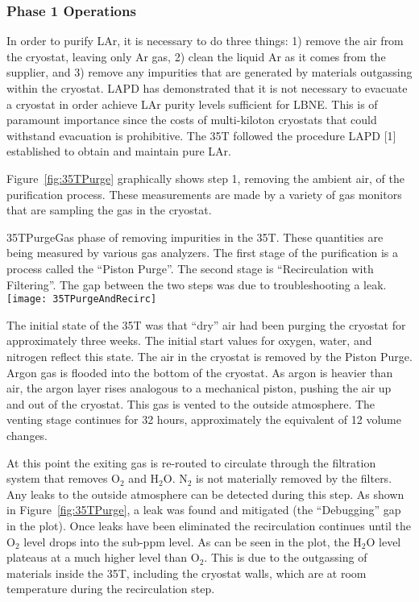 \subsubsection {Phase 1 Operations}

In order to purify LAr, it is necessary to do three things: 1) remove the air from the cryostat, leaving only Ar gas, 2) clean the liquid Ar as it comes from the supplier, and 3) remove any impurities that are generated by materials outgassing within the cryostat.  
LAPD has demonstrated that it is not necessary to evacuate a cryostat in order achieve LAr purity levels sufficient for LBNE. This is of paramount importance since the costs of multi-kiloton cryostats that could withstand evacuation is prohibitive. The 35T followed the procedure LAPD [1] established to obtain and maintain pure LAr. 


Figure~\ref{fig:35TPurge} graphically shows step 1, removing the ambient air, of the purification process. These measurements are made by a variety of gas monitors that are sampling the gas in the cryostat. 

\begin{cdrfigure}{35TPurge}{Gas phase of removing impurities in the 35T. These quantities are being measured by various gas analyzers. The first stage of the purification is a process called the ``Piston Purge''.  The second stage is ``Recirculation with Filtering''. The gap between the two steps was due to troubleshooting a leak.}
  \texttt{[image: 35TPurgeAndRecirc]}
\end{cdrfigure}

The initial state of the 35T was that ``dry'' air had been purging the cryostat for approximately three weeks. The initial start values for oxygen, water, and nitrogen reflect this state.
The air in the cryostat is removed by  the Piston Purge.  Argon gas is flooded into the bottom of the cryostat. As argon is heavier than air, the argon layer rises analogous to a mechanical piston, pushing the air up and out of the cryostat. This gas is vented to the outside atmosphere. The venting stage continues for 32 hours, approximately the equivalent of 12 volume changes. 

At this point the exiting gas is re-routed to circulate through the filtration system that removes O$_2$ and H$_2$O. N$_2$ is not materially removed by the filters. Any leaks to the outside atmosphere can be detected during this step. As shown in Figure~\ref{fig:35TPurge}, a leak was found and mitigated (the ``Debugging'' gap in the plot). Once leaks have been eliminated the recirculation continues until the O$_2$ level drops into the sub-ppm level. As can be seen in the plot, the H$_2$O level plateaus at a much higher level than O$_2$. This is due to the outgassing of materials inside the 35T, including the cryostat walls, which are at room temperature during the recirculation step. 

